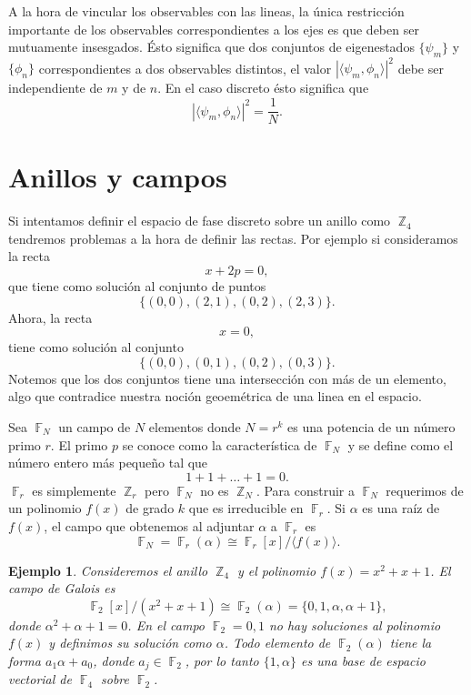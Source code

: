 \documentclass[a4paper]{report}
\DeclareMathOperator{\Z}{\mathbb{Z}}
\DeclareMathOperator{\F}{\mathbb{F}}
\newtheorem{example}{Ejemplo}
\begin{document}
  A la hora de vincular los observables con las lineas, la
  única restricción importante de los observables
  correspondientes a los ejes es que deben ser mutuamente
  insesgados. Ésto significa que dos conjuntos de
  eigenestados $\{\psi_m\}$ y $\{\phi_n\}$ correspondientes
  a dos observables distintos, el valor $|\langle \psi_m,
  \phi_n \rangle|^2$ debe ser independiente de $m$ y de $n$.
  En el caso discreto ésto significa que
  \[
    |\langle \psi_m, \phi_n \rangle|^2 = \frac{1}{N}.
  \] 

  \section{Anillos y campos}

  Si intentamos definir el espacio de fase discreto sobre un
  anillo como $\Z_4$ tendremos problemas a la hora de
  definir las rectas. Por ejemplo si consideramos la recta
  \[
    x + 2p = 0,
  \]
  que tiene como solución al conjunto de puntos
  \[
    \{(0,0), (2,1), (0,2), (2,3)\}.
  \] 
  Ahora, la recta 
  \[
    x = 0,
  \] 
  tiene como solución al conjunto
  \[
    \{(0,0), (0,1), (0,2), (0,3)\}.
  \] 
  Notemos que los dos conjuntos tiene una intersección con
  más de un elemento, algo que contradice nuestra noción
  geoemétrica de una linea en el espacio.

  Sea $\F_N$ un campo de $N$ elementos donde $N = r^{k}$ es
  una potencia de un número primo $r$. El primo $p$ se
  conoce como la característica de $\F_N$ y se define como
  el número entero más pequeño tal que
  \[
    1 + 1 + \ldots + 1 = 0.
  \] 
  $\F_r$ es simplemente $\Z_r$ pero $\F_N$ no es $\Z_N$.
  Para construir a $\F_N$ requerimos de un polinomio $f(x)$ 
  de grado $k$ que es irreducible en $\F_r$. Si $\alpha$ es
  una raíz de $f(x)$, el campo que obtenemos al adjuntar
  $\alpha$ a $\F_r$ es
  \[
    \F_N
    = \F_r(\alpha) \cong \F_r[x] / \langle f(x) \rangle.
  \] 
  \begin{example}
    Consideremos el anillo $\Z_4$ y el polinomio $f(x) = x^2
    + x + 1$. El campo de Galois es
    \[
      \F_2[x] / (x^2 + x + 1)
      \cong \F_2(\alpha)
      = \{0, 1, \alpha, \alpha + 1\},
    \] 
    donde $\alpha^2 + \alpha + 1 = 0$. En el campo $\F_2 =
    {0,1}$ no hay soluciones al polinomio $f(x)$ y definimos
    su solución como $\alpha$. Todo elemento de
    $\F_2(\alpha)$ tiene la forma $a_1 \alpha + a_0$, donde
    $a_j \in \F_2$, por lo tanto $\{1, \alpha\}$ es una base
    de espacio vectorial de $\F_4$ sobre $\F_2$.
  \end{example}
\end{document}
